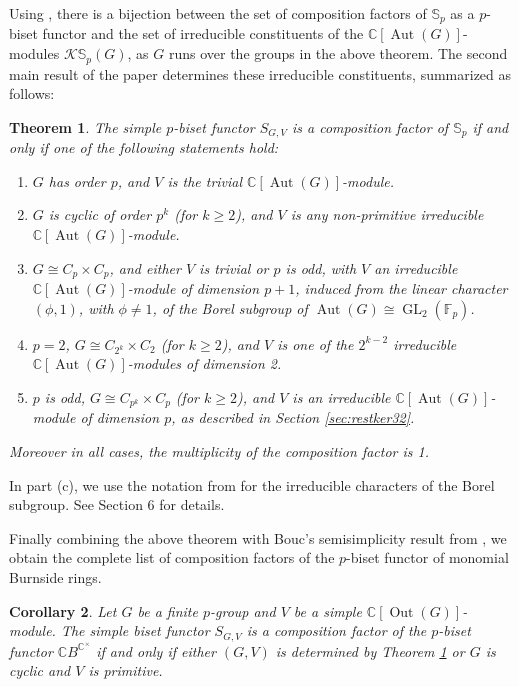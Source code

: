 \documentclass[12pt]{article}
\theoremstyle{plain}
\newtheorem{theorem}{Theorem}[section]
\newtheorem{corollary}[theorem]{Corollary}
\theoremstyle{definition}
\newcommand{\kerlin}{\mathbb S_p}
\newcommand{\out}{\operatorname{Out}}
\begin{document}
Using \cite[Theorem 2.5]{BCK}, there is a bijection between the set of composition factors of \( \kerlin \) as a \( p \)-biset functor and the set of irreducible constituents of the \( \mathbb{C}[\operatorname{Aut}(G)] \)-modules \( \mathcal{K}\kerlin(G) \), as \( G \) runs over the groups in the above theorem. The second main result of the paper determines these irreducible constituents, summarized as follows:
\begin{theorem}\label{thm:main}
The simple \( p \)-biset functor \( S_{G, V} \) is a composition factor of \( \kerlin \) if and only if one of the following statements hold:
\begin{enumerate}
    \item[\textnormal{(a)}] \( G \) has order \( p \), and \( V \) is the trivial \( \mathbb{C}[\operatorname{Aut}(G)] \)-module.
    \item[\textnormal{(b)}] \( G \) is cyclic of order \( p^k \) (for \( k \geq 2 \)), and \( V \) is any non-primitive irreducible \( \mathbb{C}[\operatorname{Aut}(G)] \)-module.
    \item[\textnormal{(c)}] \( G \cong C_p \times C_p \), and either \( V \) is trivial or \( p \) is odd, with \( V \) an irreducible \( \mathbb{C}[\operatorname{Aut}(G)] \)-module of dimension \( p+1 \), induced from the linear character \( (\phi, 1) \), with \(\phi\not= 1\), of the Borel subgroup of \( \operatorname{Aut}(G) \cong \operatorname{GL}_2(\mathbb{F}_p) \).
    \item[\textnormal{(d)}] \( p = 2 \), \( G \cong C_{2^k} \times C_2 \) (for \( k \geq 2 \)), and \( V \) is one of the \( 2^{k-2} \) irreducible \( \mathbb{C}[\operatorname{Aut}(G)] \)-modules of dimension 2.
    \item[\textnormal{(e)}] \( p \) is odd, \( G \cong C_{p^k} \times C_p \) (for \( k \geq 2 \)), and \( V \) is an irreducible \( \mathbb{C}[\operatorname{Aut}(G)] \)-module of dimension \( p \), as described in Section \ref{sec:restker32}.
\end{enumerate}
Moreover in all cases, the multiplicity of the composition factor is 1.
\end{theorem}
In part (c), we use the notation from \cite{Shapiro} for the irreducible characters of the Borel subgroup. See Section 6 for details.

Finally combining the above theorem with Bouc's semisimplicity result from \cite{Bouc0}, we obtain the complete list of composition factors of the $p$-biset functor of monomial Burnside rings.
\begin{corollary}
Let $G$ be a finite $p$-group and $V$ be a simple $\mathbb C[\out(G)]$-module. The simple biset functor $S_{G, V}$ is a composition factor of the $p$-biset functor $\mathbb CB^{\mathbb C^\times}$ if and only if either $(G, V)$ is determined by Theorem \ref{thm:main} or $G$ is cyclic and $V$ is primitive.  
\end{corollary}
\end{document}
